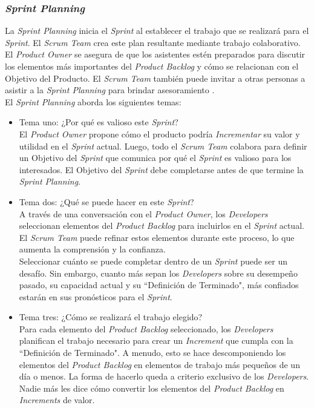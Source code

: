 \begin{spacing}{1.5}
		\subsubsection{\textit{Sprint Planning}}
			La \textit{Sprint Planning} inicia el \textit{Sprint} al establecer el trabajo que se realizará para el \textit{Sprint}. El \textit{Scrum Team} crea este plan resultante mediante trabajo colaborativo.\\
			El \textit{Product Owner} se asegura de que los asistentes estén preparados para discutir los elementos más importantes del \textit{Product Backlog} y cómo se relacionan con el Objetivo del Producto. El \textit{Scrum Team} también puede invitar a otras personas a asistir a la \textit{Sprint Planning} para brindar asesoramiento \cite{chap2_scrum}.\\
			El \textit{Sprint Planning} aborda los siguientes temas:
			\begin{itemize}
				\item Tema uno: ¿Por qué es valioso este \textit{Sprint}?\\
				El \textit{Product Owner} propone cómo el producto podría \textit{Incrementar} su valor y utilidad en el \textit{Sprint} actual. Luego, todo el \textit{Scrum Team} colabora para definir un Objetivo del \textit{Sprint} que comunica por qué el \textit{Sprint} es valioso para los interesados. El Objetivo del \textit{Sprint} debe completarse antes de que termine la \textit{Sprint Planning}.
				\item Tema dos: ¿Qué se puede hacer en este \textit{Sprint}?\\
				A través de una conversación con el \textit{Product Owner}, los \textit{Developers} seleccionan elementos del \textit{Product Backlog} para incluirlos en el \textit{Sprint} actual. El \textit{Scrum Team} puede refinar estos elementos durante este proceso, lo que aumenta la comprensión y la confianza.\\
				Seleccionar cuánto se puede completar dentro de un \textit{Sprint} puede ser un desafío. Sin embargo, cuanto más sepan los \textit{Developers} sobre su desempeño pasado, su capacidad actual y su ``Definición de Terminado", más confiados estarán en sus pronósticos para el \textit{Sprint}.
				\item Tema tres: ¿Cómo se realizará el trabajo elegido?\\
				Para cada elemento del \textit{Product Backlog} seleccionado, los \textit{Developers} planifican el trabajo necesario para crear un \textit{Increment} que cumpla con la ``Definición de Terminado". A menudo, esto se hace descomponiendo los elementos del \textit{Product Backlog} en elementos de trabajo más pequeños de un día o menos. La forma de hacerlo queda a criterio exclusivo de los \textit{Developers}. Nadie más les dice cómo convertir los elementos del \textit{Product Backlog} en \textit{Increments} de valor.\\

\end{itemize}
\end{spacing}
